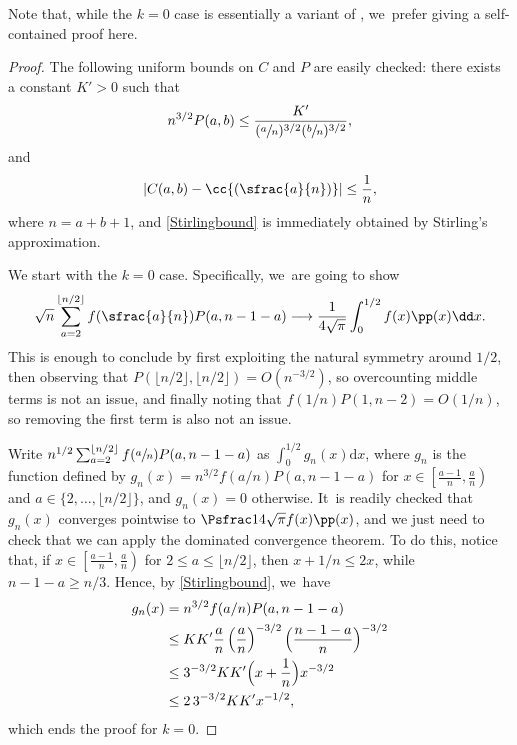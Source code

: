 Note that, while the $k=0$ case is essentially a variant of \cite[Prop.\,39]{HM12}, we~prefer giving a self-contained proof here.
\begin{proof} The following uniform bounds on $C$ and $P$ are easily checked: there exists a constant $K'>0$ such that
\begin{equation}\label{Stirlingbound}
n^{3/2} P(a,b) \leq \frac{K'}{(\sfrac{a}{n})^{3/2}(\sfrac{b}{n})^{3/2}},
\end{equation}
and
\begin{equation}\label{eq:boundc1}
\left|C(a,b)-\cc{\left(\sfrac{a}{n}\right)}\right|\leq\frac1n,
\end{equation}
where $n=a+b+1$, and \eqref{Stirlingbound} is immediately obtained by Stirling's approximation.

We start with the $k=0$ case. Specifically, we~are going to show
\[
\sqrt{n} \sum_{a=2}^{\lfloor n/2\rfloor} f{(\sfrac{a}{n})}P(a,n-1-a) \longrightarrow \frac{1}{4\sqrt{\pi}}\int_0^{1/2} f(x) \pp(x) \dd x.
\]
This is enough to conclude by first exploiting the natural symmetry around $1/2$, then observing that $P(\lfloor n/2\rfloor,\lfloor n/2 \rfloor)=O(n^{-3/2})$, so overcounting middle terms is not an issue, and finally noting that $f(1/n)P(1,n-2)=O(1/n)$, so removing the first term is also not an issue.

Write $n^{1/2}\sum_{a=2}^{\lfloor n/2\rfloor} f(\sfrac{a}{n})P(a,n-1-a)$ as $\int_{0}^{1/2} g_n(x)\mathrm{d}x$, where $g_n$ is the function defined by $g_n(x)=n^{3/2}f(a/n)P(a,n-1-a)$ for $x\in \left[\frac{a-1}{n},\frac{a}{n}\right)$ and $a\in \{2,\ldots,\lfloor n/2\rfloor\}$, and $g_n(x)=0$ otherwise. It~is readily checked that $g_n(x)$ converges pointwise to $\Psfrac1{4\sqrt{\pi}}f(x) \pp(x)$, and we just need to check that we can apply the dominated convergence theorem. To do this, notice that, if $x\in \left[\frac{a-1}{n},\frac{a}{n}\right)$ for $2\leq a \leq \lfloor n/2\rfloor$, then $x+1/n\leq 2x$, while $n-1-a\geq n/3$. Hence, by \eqref{Stirlingbound}, we~have
\begin{align*}
g_n(x)& =n^{3/2}f(a/n)P(a,n-1-a) \\
&\leq KK'\frac{a}{n} \left(\frac{a}{n}\right)^{-3/2}\Bigl(\frac{n-1-a}{n}\Bigr)^{-3/2} \\
&\leq 3^{-3/2}KK' \Bigl(x+\frac{1}{n}\Bigr)x^{-3/2} \\
&\leq 2\,3^{-3/2}KK'x^{-1/2},
\end{align*}
which ends the proof for $k=0$.


\end{proof}
